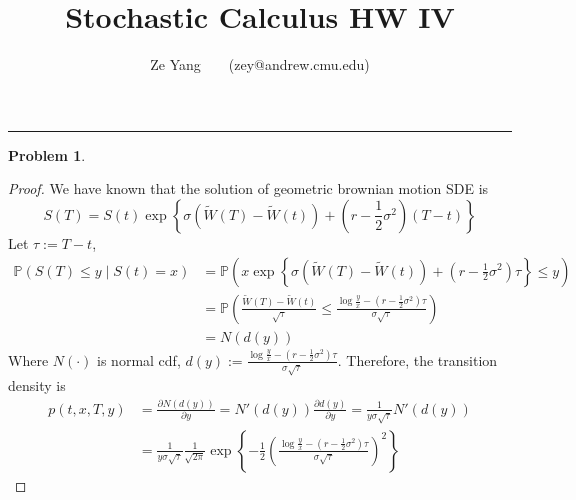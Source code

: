 \documentclass[a4paper, 10pt]{article}
\title{\textbf{Stochastic Calculus HW IV}}
\author{Ze Yang~~~~(zey@andrew.cmu.edu)}
\theoremstyle{definition}
\newtheorem{problem}{Problem}
\theoremstyle{hSol}
\begin{document}
\maketitle



\noindent\rule{16cm}{0.4pt}
\begin{problem} 
\end{problem}
\begin{proof} We have known that the solution of geometric brownian motion SDE is
\begin{equation}
  S(T) = S(t)\exp\left\{\sigma(\widetilde{W}(T)-\widetilde{W}(t) ) + \left(r-\frac{1}{2}\sigma^2\right)(T-t)\right\}
\end{equation}
Let $\tau:=T-t$,
\begin{equation}
  \begin{split}
    \mathbb{P}\left(S(T)\leq y \mid S(t)=x\right) &= \mathbb{P}\left(x\exp\left\{\sigma(\widetilde{W}(T)-\widetilde{W}(t) ) + \left(r-\frac{1}{2}\sigma^2\right)\tau\right\} \leq y\right)\\
    &= \mathbb{P}\left(\frac{\widetilde{W}(T)-\widetilde{W}(t)}{\sqrt{\tau}} \leq \frac{\log \frac{y}{x} -(r-\frac{1}{2}\sigma^2)\tau}{\sigma \sqrt{\tau}}\right)\\
    &=N(d(y))
  \end{split}
\end{equation}
Where $N(\cdot)$ is normal cdf, $d(y):=\frac{\log \frac{y}{x} -(r-\frac{1}{2}\sigma^2)\tau}{\sigma \sqrt{\tau}}$. Therefore, the transition density is
\begin{equation}
  \begin{split}
    p(t,x,T,y) &= \frac{\partial N(d(y))}{\partial y} =N'(d(y)) \frac{\partial d(y)}{\partial y} = \frac{1}{y\sigma \sqrt{\tau}} N'(d(y)) \\
    &=\frac{1}{y\sigma \sqrt{\tau}} \frac{1}{\sqrt{2\pi}} \exp\left\{-\frac{1}{2}\left(\frac{\log \frac{y}{x} -(r-\frac{1}{2}\sigma^2)\tau}{\sigma \sqrt{\tau}}\right)^2\right\}
  \end{split}
\end{equation}
\end{proof}
\end{document}
